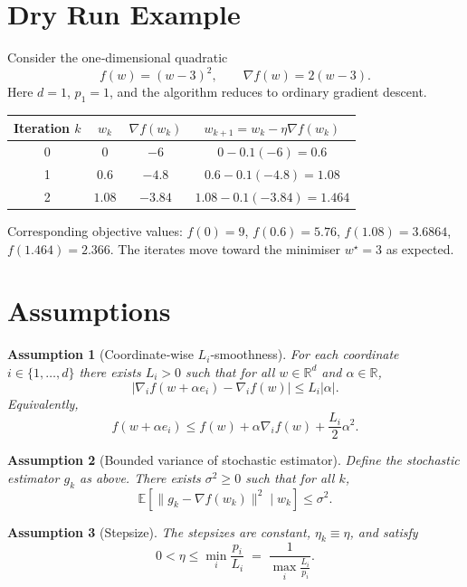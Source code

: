 \documentclass{article}
\newtheorem{assumption}{Assumption}
\begin{document}
\section*{Dry Run Example}
Consider the one‑dimensional quadratic
\[
    f(w)=(w-3)^2,\qquad \nabla f(w)=2(w-3).
\]
Here $d=1$, $p_1=1$, and the algorithm reduces to ordinary gradient descent.

\begin{center}
\begin{tabular}{c|c|c|c}
Iteration $k$ & $w_k$ & $\nabla f(w_k)$ & $w_{k+1}=w_k-\eta \nabla f(w_k)$\\ \hline
0 & $0$ & $-6$ & $0-0.1(-6)=0.6$\\
1 & $0.6$ & $-4.8$ & $0.6-0.1(-4.8)=1.08$\\
2 & $1.08$ & $-3.84$ & $1.08-0.1(-3.84)=1.464$\\
\end{tabular}
\end{center}
Corresponding objective values:
$f(0)=9$, $f(0.6)=5.76$, $f(1.08)=3.6864$, $f(1.464)=2.366$.
The iterates move toward the minimiser $w^\star=3$ as expected.

\newpage

\section*{Assumptions}
\begin{assumption}[Coordinate‑wise $L_i$‑smoothness]\label{as:smooth}
For each coordinate $i\in\{1,\dots ,d\}$ there exists $L_i>0$ such that for all $w\in\mathbb{R}^d$ and $\alpha\in\mathbb{R}$,
\[
    \bigl|\nabla_i f(w+\alpha e_i)-\nabla_i f(w)\bigr|\le L_i|\alpha|.
\]
Equivalently,
\[
    f(w+\alpha e_i)\le f(w)+\alpha \nabla_i f(w)+\frac{L_i}{2}\alpha^2 .
\]
\end{assumption}

\begin{assumption}[Bounded variance of stochastic estimator]\label{as:variance}
Define the stochastic estimator $g_k$ as above. There exists $\sigma^2\ge0$ such that for all $k$,
\[
    \mathbb{E}\!\left[\bigl\|g_k-\nabla f(w_k)\bigr\|^2\mid w_k\right]\le\sigma^2 .
\]
\end{assumption}

\begin{assumption}[Stepsize]\label{as:stepsize}
The stepsizes are constant, $\eta_k\equiv\eta$, and satisfy
\[
    0<\eta\le \min_{i}\frac{p_i}{L_i}\;=\;\frac{1}{\displaystyle\max_{i}\frac{L_i}{p_i}}.
\]
\end{assumption}
\end{document}
